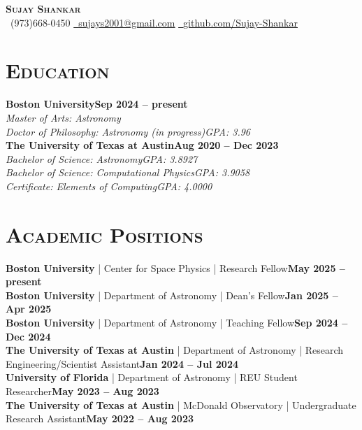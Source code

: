 \documentclass[11pt]{article}
\begin{document}
\begin{center}
    {\Huge \textbf{\textsc{Sujay Shankar}}} \\ \vspace{2pt}
    \faPhoneSquare~(973)668-0450 \hspace{5pt}
    \faEnvelopeSquare\href{mailto:sujays2001@gmail.com}{~\underline{sujays2001@gmail.com}} \hspace{5pt}
    \faGithubSquare\href{https://github.com/Sujay-Shankar}{~\underline{github.com/Sujay-Shankar}}
\end{center}

\section{\textsc{Education}}
\normalsize\textbf{Boston University}\hfill\small\textbf{Sep 2024 -- present}
\\ \textit{Master of Arts: Astronomy}
\\ \textit{Doctor of Philosophy: Astronomy (in progress)\hfill GPA: 3.96}
\\ \normalsize\textbf{The University of Texas at Austin}\hfill\small\textbf{Aug 2020 -- Dec 2023}
\\ \textit{Bachelor of Science: Astronomy\hfill GPA: 3.8927}
\\ \textit{Bachelor of Science: Computational Physics\hfill GPA: 3.9058}
\\ \textit{Certificate: Elements of Computing\hfill GPA: 4.0000} \vspace{5pt}

\section{\textsc{Academic Positions}}
\footnotesize
\textbf{Boston University} | Center for Space Physics | Research Fellow\hfill\textbf{May 2025 -- present} \\
\textbf{Boston University} | Department of Astronomy | Dean's Fellow\hfill\textbf{Jan 2025 -- Apr 2025} \\
\textbf{Boston University} | Department of Astronomy | Teaching Fellow\hfill\textbf{Sep 2024 -- Dec 2024} \\
\textbf{The University of Texas at Austin} | Department of Astronomy | Research Engineering/Scientist Assistant\hfill\textbf{Jan 2024 -- Jul 2024} \\
\textbf{University of Florida} | Department of Astronomy | REU Student Researcher\hfill\textbf{May 2023 -- Aug 2023} \\
\textbf{The University of Texas at Austin} | McDonald Observatory | Undergraduate Research Assistant\hfill\textbf{May 2022 -- Aug 2023} \\
\end{document}
